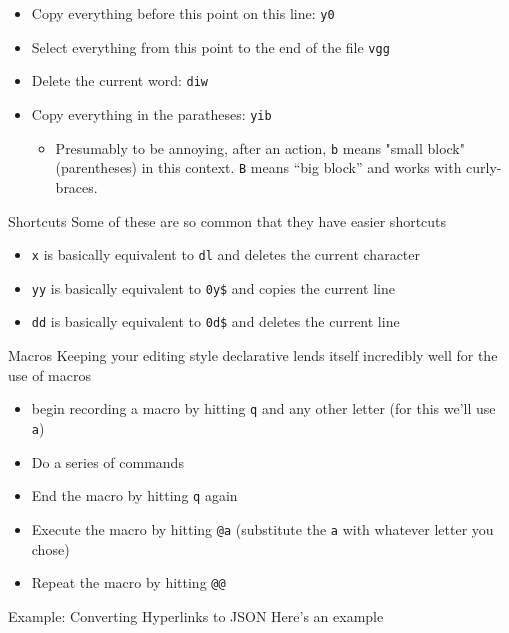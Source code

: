 \documentclass{beamer}
\begin{document}
\begin{frame}
	\begin{itemize}	
		\item Copy everything before this point on this line: \texttt{y0}
		\item Select everything from this point to the end of the file \texttt{vgg}
		\item Delete the current word: \texttt{diw}
		\item Copy everything in the paratheses: \texttt{yib} \begin {itemize}
		\item Presumably to be annoying, after an action, \texttt{b} means "small block" (parentheses) in this context. \texttt{B} means ``big block'' and works with curly-braces. 
	        \end{itemize}
	\end{itemize}
	\end{frame}
\begin{frame}{Shortcuts}
  Some of these are so common that they have easier shortcuts
  \begin{itemize}
	  \item \texttt{x} is basically equivalent to \texttt{dl} and deletes the current character
	  \item \texttt{yy} is basically equivalent to \texttt{0y\$} and copies the current line
	  \item \texttt{dd} is basically equivalent to \texttt{0d\$} and deletes the current line
  \end{itemize}
\end{frame}
\begin{frame}{Macros}
   Keeping your editing style declarative lends itself incredibly well for the use of macros
   \begin{itemize}
	   \item begin recording a macro by hitting \texttt{q} and any other letter (for this we'll use \texttt{a})
           \item Do a series of commands 
	   \item End the macro by hitting \texttt{q} again
	   \item Execute the macro by hitting \texttt{@a} (substitute the \texttt{a} with whatever letter you chose)
	   \item Repeat the macro by hitting \texttt{@@}
   \end{itemize}
\end{frame}
\begin{frame}{Example: Converting Hyperlinks to JSON}
	Here's an example 
\end{frame}
\end{document}
